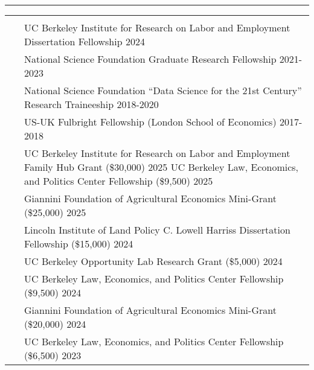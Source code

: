\documentclass[letterpaper,10pt,oneside]{article}
\newenvironment{myresume}[2]{\pdfbookmark{#1}{#1}{\LARGE{\textbf{#1}}}\vspace{1mm}\hrule\vspace{-2mm}\begin{longtable}{p{0.12\textwidth} p{0.8\textwidth}}&#2}{\end{longtable}}
\renewcommand{\section}[2]{\vspace{-1.5em}\\\pdfbookmark{#1}{#2}{\singlespace\textsc{#1}}&}
\newcommand{\firstentry}[1]{\vspace{0em}\newline#1\vspace{0em}}
\newcommand{\entry}[1]{\vspace{-1em}\\~&#1}
\begin{document}
\begin{myresume}{}
\vspace{1.5em}


\section{Awards}{awards}

\firstentry{UC Berkeley Institute for Research on Labor and Employment Dissertation Fellowship \hfill 2024
}

\entry{National Science Foundation Graduate Research Fellowship 
\hfill 2021-2023
}

\entry{National Science Foundation “Data Science for the 21st Century” Research Traineeship
\hfill 2018-2020
}

\entry{US-UK Fulbright Fellowship (London School of Economics) \hfill 2017-2018
}


\section{Research \newline Grants}{grants}

\firstentry{UC Berkeley Institute for Research on Labor and Employment Family Hub Grant (\$30,000) \hspace{1.35cm} 2025 %
\newline UC Berkeley Law, Economics, and Politics Center Fellowship (\$9,500) \hfill 2025
}

\entry{Giannini Foundation of Agricultural Economics Mini-Grant (\$25,000) \hfill 2025
}

\entry{Lincoln Institute of Land Policy C. Lowell Harriss Dissertation Fellowship (\$15,000) \hfill 2024
}

\entry{UC Berkeley Opportunity Lab Research Grant (\$5,000) \hfill 2024
}

\entry{ UC Berkeley Law, Economics, and Politics Center Fellowship (\$9,500) \hfill 2024
}

\entry{Giannini Foundation of Agricultural Economics Mini-Grant (\$20,000) \hfill 2024
}

\entry{UC Berkeley Law, Economics, and Politics Center Fellowship (\$6,500) \hfill 2023
}


\end{myresume}
\end{document}
